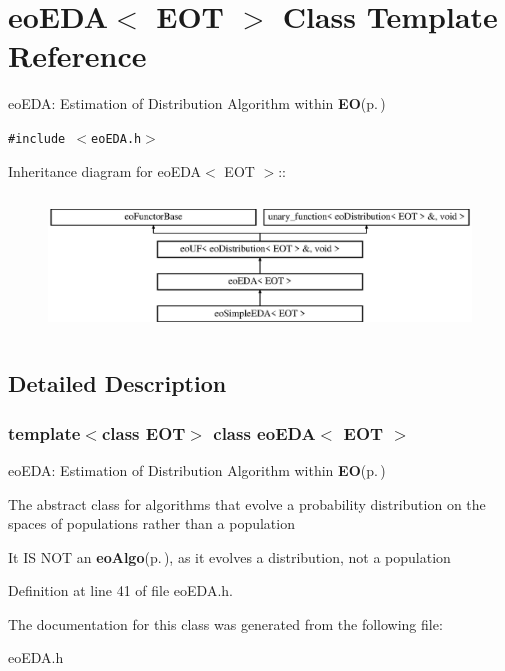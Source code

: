 \section{eo\-EDA$<$ EOT $>$ Class Template Reference}
\label{classeo_e_d_a}
eo\-EDA: Estimation of Distribution Algorithm within {\bf EO}{\rm (p.\,\pageref{class_e_o})}  


{\tt \#include $<$eo\-EDA.h$>$}

Inheritance diagram for eo\-EDA$<$ EOT $>$::\begin{figure}[H]
\begin{center}
\leavevmode
\includegraphics[height=3.70861cm]{classeo_e_d_a}
\end{center}
\end{figure}


\subsection{Detailed Description}
\subsubsection*{template$<$class EOT$>$ class eo\-EDA$<$ EOT $>$}

eo\-EDA: Estimation of Distribution Algorithm within {\bf EO}{\rm (p.\,\pageref{class_e_o})} 

The abstract class for algorithms that evolve a probability distribution on the spaces of populations rather than a population

It IS NOT an {\bf eo\-Algo}{\rm (p.\,\pageref{classeo_algo})}, as it evolves a distribution, not a population 



Definition at line 41 of file eo\-EDA.h.

The documentation for this class was generated from the following file:\begin{CompactItemize}
\item 
eo\-EDA.h\end{CompactItemize}
